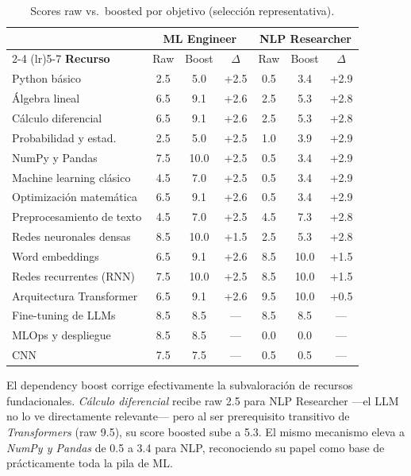 \documentclass[11pt, a4paper]{article}
\begin{document}
\begin{table}[H]
\centering
\small
\caption{Scores raw vs.\ boosted por objetivo (selección representativa).}
\begin{tabular}{l ccc ccc}
\toprule
& \multicolumn{3}{c}{\textbf{ML Engineer}} & \multicolumn{3}{c}{\textbf{NLP Researcher}} \\
\cmidrule(lr){2-4} \cmidrule(lr){5-7}
\textbf{Recurso} & Raw & Boost & $\Delta$ & Raw & Boost & $\Delta$ \\
\midrule
Python básico            & 2.5 & 5.0  & +2.5 & 0.5 & 3.4  & +2.9 \\
Álgebra lineal           & 6.5 & 9.1  & +2.6 & 2.5 & 5.3  & +2.8 \\
Cálculo diferencial      & 6.5 & 9.1  & +2.6 & 2.5 & 5.3  & +2.8 \\
Probabilidad y estad.    & 2.5 & 5.0  & +2.5 & 1.0 & 3.9  & +2.9 \\
NumPy y Pandas           & 7.5 & 10.0 & +2.5 & 0.5 & 3.4  & +2.9 \\
Machine learning clásico & 4.5 & 7.0  & +2.5 & 0.5 & 3.4  & +2.9 \\
Optimización matemática  & 6.5 & 9.1  & +2.6 & 0.5 & 3.4  & +2.9 \\
Preprocesamiento de texto& 4.5 & 7.0  & +2.5 & 4.5 & 7.3  & +2.8 \\
Redes neuronales densas  & 8.5 & 10.0 & +1.5 & 2.5 & 5.3  & +2.8 \\
Word embeddings          & 6.5 & 9.1  & +2.6 & 8.5 & 10.0 & +1.5 \\
Redes recurrentes (RNN)  & 7.5 & 10.0 & +2.5 & 8.5 & 10.0 & +1.5 \\
Arquitectura Transformer & 6.5 & 9.1  & +2.6 & 9.5 & 10.0 & +0.5 \\
Fine-tuning de LLMs      & 8.5 & 8.5  & ---  & 8.5 & 8.5  & ---  \\
MLOps y despliegue       & 8.5 & 8.5  & ---  & 0.0 & 0.0  & ---  \\
CNN                      & 7.5 & 7.5  & ---  & 0.5 & 0.5  & ---  \\
\bottomrule
\end{tabular}
\end{table}

El dependency boost corrige efectivamente la subvaloración de recursos fundacionales. \emph{Cálculo diferencial} recibe raw 2.5 para NLP Researcher —el LLM no lo ve directamente relevante— pero al ser prerequisito transitivo de \emph{Transformers} (raw 9.5), su score boosted sube a 5.3. El mismo mecanismo eleva a \emph{NumPy y Pandas} de 0.5 a 3.4 para NLP, reconociendo su papel como base de prácticamente toda la pila de ML.
\end{document}
